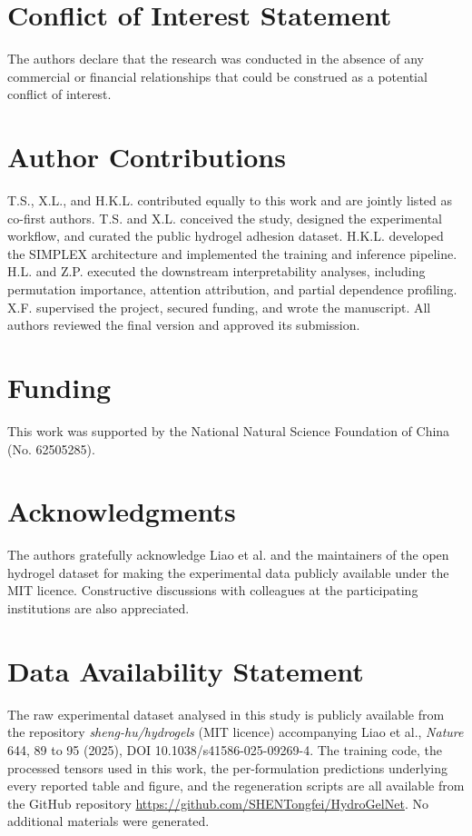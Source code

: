 \documentclass[utf8]{FrontiersinHarvard}
\begin{document}
\section*{Conflict of Interest Statement}

The authors declare that the research was conducted in the absence of any commercial or financial relationships that could be construed as a potential conflict of interest.

\section*{Author Contributions}

T.S., X.L., and H.K.L. contributed equally to this work and are jointly listed as co-first authors. T.S. and X.L. conceived the study, designed the experimental workflow, and curated the public hydrogel adhesion dataset. H.K.L. developed the SIMPLEX architecture and implemented the training and inference pipeline. H.L. and Z.P. executed the downstream interpretability analyses, including permutation importance, attention attribution, and partial dependence profiling. X.F. supervised the project, secured funding, and wrote the manuscript. All authors reviewed the final version and approved its submission.

\section*{Funding}

This work was supported by the National Natural Science Foundation of China (No. 62505285).

\section*{Acknowledgments}

The authors gratefully acknowledge Liao et al. and the maintainers of the open hydrogel dataset for making the experimental data publicly available under the MIT licence. Constructive discussions with colleagues at the participating institutions are also appreciated.

\section*{Data Availability Statement}

The raw experimental dataset analysed in this study is publicly available from the repository \emph{sheng-hu/hydrogels} (MIT licence) accompanying Liao et al., \textit{Nature} 644, 89 to 95 (2025), DOI 10.1038/s41586-025-09269-4. The training code, the processed tensors used in this work, the per-formulation predictions underlying every reported table and figure, and the regeneration scripts are all available from the GitHub repository \url{https://github.com/SHENTongfei/HydroGelNet}. No additional materials were generated.



\end{document}
